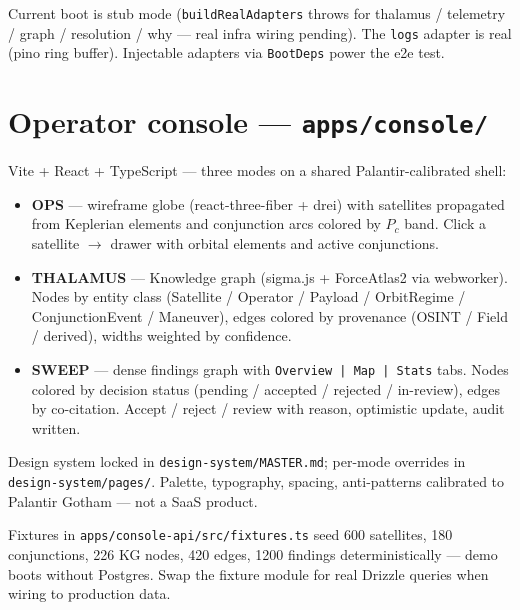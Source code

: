 Current boot is stub mode (\texttt{buildRealAdapters} throws for thalamus / telemetry / graph / resolution / why --- real infra wiring pending). The \texttt{logs} adapter is real (pino ring buffer). Injectable adapters via \texttt{BootDeps} power the e2e test.

\section{Operator console --- \texttt{apps/console/}}

Vite + React + TypeScript --- three modes on a shared Palantir-calibrated shell:

\begin{itemize}[leftmargin=1.2em]
  \item \textbf{OPS} --- wireframe globe (react-three-fiber + drei) with satellites propagated from Keplerian elements and conjunction arcs colored by $P_c$ band. Click a satellite $\to$ drawer with orbital elements and active conjunctions.
  \item \textbf{THALAMUS} --- Knowledge graph (sigma.js + ForceAtlas2 via webworker). Nodes by entity class (Satellite / Operator / Payload / OrbitRegime / ConjunctionEvent / Maneuver), edges colored by provenance (OSINT / Field / derived), widths weighted by confidence.
  \item \textbf{SWEEP} --- dense findings graph with \texttt{Overview | Map | Stats} tabs. Nodes colored by decision status (pending / accepted / rejected / in-review), edges by co-citation. Accept / reject / review with reason, optimistic update, audit written.
\end{itemize}

Design system locked in \texttt{design-system/MASTER.md}; per-mode overrides in \texttt{design-system/pages/}. Palette, typography, spacing, anti-patterns calibrated to Palantir Gotham --- not a SaaS product.

Fixtures in \texttt{apps/console-api/src/fixtures.ts} seed 600 satellites, 180 conjunctions, 226 KG nodes, 420 edges, 1200 findings deterministically --- demo boots without Postgres. Swap the fixture module for real Drizzle queries when wiring to production data.


